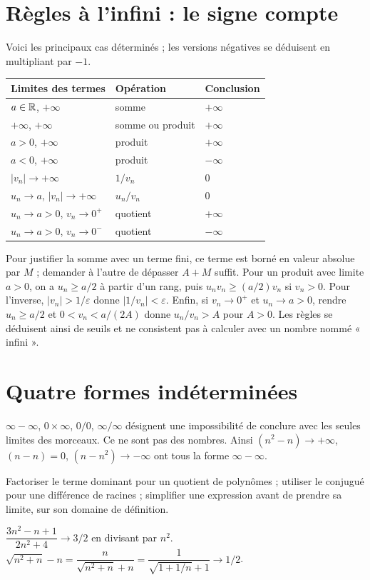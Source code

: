 \documentclass[../cours_tle.tex]{subfiles}
\begin{document}
\section{Règles à l'infini : le signe compte}
Voici les principaux cas déterminés ; les versions négatives se déduisent en multipliant par $-1$.
\begin{center}\begin{tabular}{lll}\toprule
Limites des termes & Opération & Conclusion\\\midrule
$a\in\mathbb{R}$, $+\infty$ & somme & $+\infty$\\
$+\infty$, $+\infty$ & somme ou produit & $+\infty$\\
$a>0$, $+\infty$ & produit & $+\infty$\\
$a<0$, $+\infty$ & produit & $-\infty$\\
$|v_n|\to+\infty$ & $1/v_n$ & $0$\\
$u_n\to a$, $|v_n|\to+\infty$ & $u_n/v_n$ & $0$\\
$u_n\to a>0$, $v_n\to0^+$ & quotient & $+\infty$\\
$u_n\to a>0$, $v_n\to0^-$ & quotient & $-\infty$\\\bottomrule
\end{tabular}\end{center}
Pour justifier la somme avec un terme fini, ce terme est borné en valeur absolue par $M$ ; demander à l'autre de dépasser $A+M$ suffit. Pour un produit avec limite $a>0$, on a $u_n\ge a/2$ à partir d'un rang, puis $u_nv_n\ge(a/2)v_n$ si $v_n>0$. Pour l'inverse, $|v_n|>1/\varepsilon$ donne $|1/v_n|<\varepsilon$. Enfin, si $v_n\to0^+$ et $u_n\to a>0$, rendre $u_n\ge a/2$ et $0<v_n<a/(2A)$ donne $u_n/v_n>A$ pour $A>0$. Les règles se déduisent ainsi de seuils et ne consistent pas à calculer avec un nombre nommé « infini ».

\section{Quatre formes indéterminées}
$\infty-\infty$, $0\times\infty$, $0/0$, $\infty/\infty$ désignent une impossibilité de conclure avec les seules limites des morceaux. Ce ne sont pas des nombres.
Ainsi $(n^2-n)\to+\infty$, $(n-n)=0$, $(n-n^2)\to-\infty$ ont tous la forme $\infty-\infty$.
\begin{methode}
Factoriser le terme dominant pour un quotient de polynômes ; utiliser le conjugué pour une différence de racines ; simplifier une expression avant de prendre sa limite, sur son domaine de définition.
\end{methode}
\begin{exemple}
$\dfrac{3n^2-n+1}{2n^2+4}\to3/2$ en divisant par $n^2$.
$\sqrt{n^2+n}-n=\dfrac{n}{\sqrt{n^2+n}+n}=\dfrac1{\sqrt{1+1/n}+1}\to1/2$.
\end{exemple}
\end{document}
